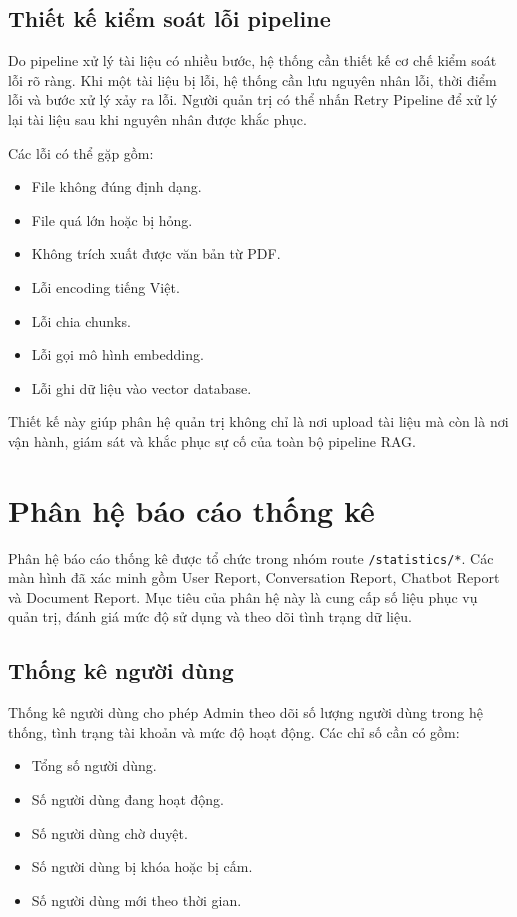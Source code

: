 \subsection{Thiết kế kiểm soát lỗi pipeline}

Do pipeline xử lý tài liệu có nhiều bước, hệ thống cần thiết kế cơ chế kiểm soát lỗi rõ ràng. Khi một tài liệu bị lỗi, hệ thống cần lưu nguyên nhân lỗi, thời điểm lỗi và bước xử lý xảy ra lỗi. Người quản trị có thể nhấn Retry Pipeline để xử lý lại tài liệu sau khi nguyên nhân được khắc phục.

Các lỗi có thể gặp gồm:

\begin{itemize}
    \item File không đúng định dạng.
    \item File quá lớn hoặc bị hỏng.
    \item Không trích xuất được văn bản từ PDF.
    \item Lỗi encoding tiếng Việt.
    \item Lỗi chia chunks.
    \item Lỗi gọi mô hình embedding.
    \item Lỗi ghi dữ liệu vào vector database.
\end{itemize}

Thiết kế này giúp phân hệ quản trị không chỉ là nơi upload tài liệu mà còn là nơi vận hành, giám sát và khắc phục sự cố của toàn bộ pipeline RAG.

\section{Phân hệ báo cáo thống kê}

Phân hệ báo cáo thống kê được tổ chức trong nhóm route \texttt{/statistics/*}. Các màn hình đã xác minh gồm User Report, Conversation Report, Chatbot Report và Document Report. Mục tiêu của phân hệ này là cung cấp số liệu phục vụ quản trị, đánh giá mức độ sử dụng và theo dõi tình trạng dữ liệu.

\subsection{Thống kê người dùng}

Thống kê người dùng cho phép Admin theo dõi số lượng người dùng trong hệ thống, tình trạng tài khoản và mức độ hoạt động. Các chỉ số cần có gồm:

\begin{itemize}
    \item Tổng số người dùng.
    \item Số người dùng đang hoạt động.
    \item Số người dùng chờ duyệt.
    \item Số người dùng bị khóa hoặc bị cấm.
    \item Số người dùng mới theo thời gian.
\end{itemize}

